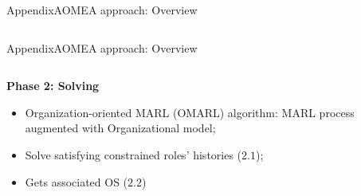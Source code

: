 \begin{frame}{Appendix}{AOMEA approach: Overview}
\begin{columns}
    \end{columns}

\end{frame}


\begin{frame}{Appendix}{AOMEA approach: Overview}

    \begin{columns}

        \begin{column}{0.6\textwidth}

            \textbf{Phase 2: Solving}

            \begin{itemize}
                \item Organization-oriented MARL (OMARL) algorithm: MARL process augmented with Organizational model;
                \item Solve satisfying constrained roles' histories ($2.1$);
                \item Gets associated OS ($2.2$)
            \end{itemize}

        \end{column}


\end{columns}
\end{frame}
